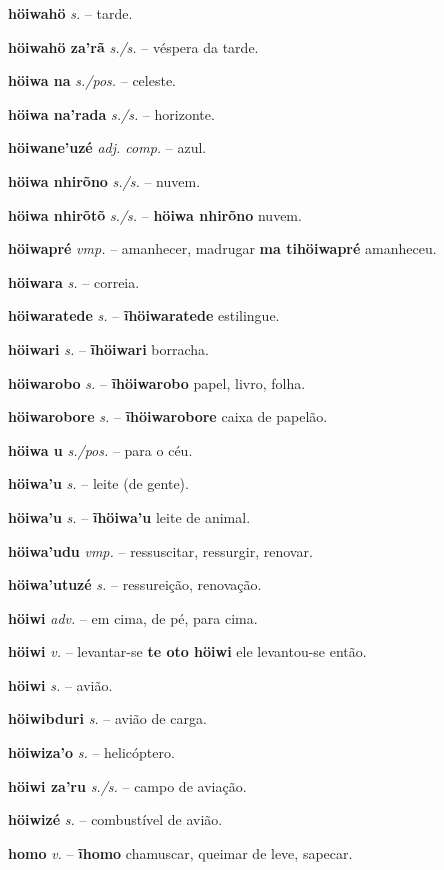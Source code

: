 \textbf{höiwahö} \textit{s.} -- tarde.

\textbf{höiwahö za'rã} \textit{s./s.} -- véspera da tarde.

\textbf{höiwa na} \textit{s./pos.} -- celeste.

\textbf{höiwa na'rada} \textit{s./s.} -- horizonte.

\textbf{höiwane'uzé} \textit{adj. comp.} -- azul.

\textbf{höiwa nhirõno} \textit{s./s.} -- nuvem.

\textbf{höiwa nhirõtõ} \textit{s./s.} -- \textbf{höiwa nhirõno} nuvem.

\textbf{höiwapré} \textit{vmp.} -- amanhecer, madrugar  \textbf{ma tihöiwapré} amanheceu.

\textbf{höiwara} \textit{s.} -- correia.

\textbf{höiwaratede} \textit{s.} -- \textbf{ĩhöiwaratede} estilingue.

\textbf{höiwari} \textit{s.} -- \textbf{ĩhöiwari} borracha.

\textbf{höiwarobo} \textit{s.} -- \textbf{ĩhöiwarobo} papel, livro, folha.

\textbf{höiwarobore} \textit{s.} -- \textbf{ĩhöiwarobore} caixa de papelão.

\textbf{höiwa u} \textit{s./pos.} -- para o céu.

\textbf{höiwa'u} \textit{s.} -- leite (de gente).

\textbf{höiwa'u} \textit{s.} -- \textbf{ĩhöiwa'u} leite de animal.

\textbf{höiwa'udu} \textit{vmp.} -- ressuscitar, ressurgir, renovar.

\textbf{höiwa'utuzé} \textit{s.} -- ressureição, renovação.

\textbf{höiwi} \textit{adv.} -- em cima, de pé, para cima.

\textbf{höiwi} \textit{v.} -- levantar-se  \textbf{te oto höiwi} ele levantou-se então.

\textbf{höiwi} \textit{s.} -- avião.

\textbf{höiwibduri} \textit{s.} -- avião de carga.

\textbf{höiwiza'o} \textit{s.} -- helicóptero.

\textbf{höiwi za'ru} \textit{s./s.} -- campo de aviação.

\textbf{höiwizé} \textit{s.} -- combustível de avião.

\textbf{homo} \textit{v.} -- \textbf{ĩhomo} chamuscar, queimar de leve, sapecar.

